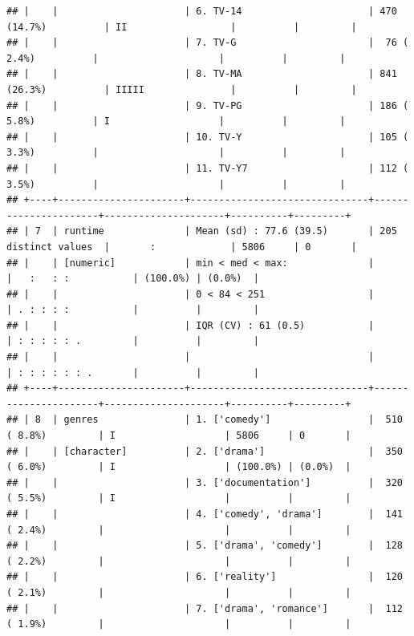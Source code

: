 \documentclass[11pt,preprint]{elsarticle}
\numberwithin{equation}{section}
\numberwithin{figure}{section}
\numberwithin{table}{section}
\begin{document}
\begin{verbatim}
## |    |                      | 6. TV-14                      | 470 (14.7%)          | II                  |          |         |
## |    |                      | 7. TV-G                       |  76 ( 2.4%)          |                     |          |         |
## |    |                      | 8. TV-MA                      | 841 (26.3%)          | IIIII               |          |         |
## |    |                      | 9. TV-PG                      | 186 ( 5.8%)          | I                   |          |         |
## |    |                      | 10. TV-Y                      | 105 ( 3.3%)          |                     |          |         |
## |    |                      | 11. TV-Y7                     | 112 ( 3.5%)          |                     |          |         |
## +----+----------------------+-------------------------------+----------------------+---------------------+----------+---------+
## | 7  | runtime              | Mean (sd) : 77.6 (39.5)       | 205 distinct values  |       :             | 5806     | 0       |
## |    | [numeric]            | min < med < max:              |                      |   :   : :           | (100.0%) | (0.0%)  |
## |    |                      | 0 < 84 < 251                  |                      | . : : : :           |          |         |
## |    |                      | IQR (CV) : 61 (0.5)           |                      | : : : : : .         |          |         |
## |    |                      |                               |                      | : : : : : : .       |          |         |
## +----+----------------------+-------------------------------+----------------------+---------------------+----------+---------+
## | 8  | genres               | 1. ['comedy']                 |  510 ( 8.8%)         | I                   | 5806     | 0       |
## |    | [character]          | 2. ['drama']                  |  350 ( 6.0%)         | I                   | (100.0%) | (0.0%)  |
## |    |                      | 3. ['documentation']          |  320 ( 5.5%)         | I                   |          |         |
## |    |                      | 4. ['comedy', 'drama']        |  141 ( 2.4%)         |                     |          |         |
## |    |                      | 5. ['drama', 'comedy']        |  128 ( 2.2%)         |                     |          |         |
## |    |                      | 6. ['reality']                |  120 ( 2.1%)         |                     |          |         |
## |    |                      | 7. ['drama', 'romance']       |  112 ( 1.9%)         |                     |          |         |

\end{verbatim}
\end{document}

